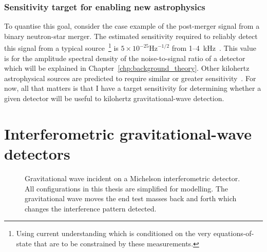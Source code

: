 \subsubsection{Sensitivity target for enabling new astrophysics}

To quantise this goal, consider the case example of the post-merger signal from a binary neutron-star merger. The estimated sensitivity required to reliably detect this signal from a typical source~\footnote{Using current understanding which is conditioned on the very equations-of-state that are to be constrained by these measurements.} is $5\times10^{-25} \mathrm{Hz}^{-1/2}$ from 1--4~kHz~\cite{miaoDesignGravitationalWaveDetectors2018}. This value is for the amplitude spectral density of the noise-to-signal ratio of a detector which will be explained in Chapter~\ref{chp:background_theory}. Other kilohertz astrophysical sources are predicted to require similar or greater sensitivity~\cite{}. For now, all that matters is that I have a target sensitivity for determining whether a given detector will be useful to kilohertz gravitational-wave detection.


\section{Interferometric gravitational-wave detectors}

\begin{figure}
	\centering
	\caption{Gravitational wave incident on a Michelson interferometric detector. All configurations in this thesis are simplified for modelling. The gravitational wave moves the end test masses back and forth which changes the interference pattern detected.}
	\label{fig:GW_incident_Michelson}
\end{figure}

